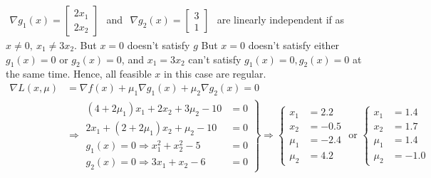 \documentclass[11pt,a4paper]{article}
\begin{document}
\begin{enumerate}[$\bullet$]
\begin{enumerate}[(1)]
        $\begin{aligned}
            \nabla g_1(x)=\begin{bmatrix}
                2x_1\\
                2x_2
            \end{bmatrix}
        \end{aligned}$ and $\begin{aligned}
            \nabla g_2(x)=\begin{bmatrix}
                3\\
                1
            \end{bmatrix}
        \end{aligned}$ are linearly independent if as $x\neq 0,\ x_1\neq 3x_2$. But $x=0$ doesn't satisfy $g$ But $x=0$ doesn't satisfy either $g_1(x)=0$ or $g_2(x)=0$, and $x_1=3x_2$ can't satisfy $g_1(x)=0,g_2(x)=0$ at the same time. Hence, all feasible $x$ in this case are regular.
        \begin{equation}
            \begin{aligned}
                \nabla L(x,\mu)&=\nabla f(x)+\mu_1 \nabla g_1(x)+\mu_2 \nabla g_2(x)=0\\
                &\Rightarrow \left.\begin{matrix}
                   (4+2\mu_1)x_1+2x_2+3\mu_2-10&=0\\
                   2x_1+(2+2\mu_1)x_2+\mu_2-10&=0\\
                   g_1(x)=0 \Rightarrow x_1^2+x_2^2-5&=0\\
                   g_2(x)=0 \Rightarrow 3x_1+x_2-6&=0
                \end{matrix}\right\}\Rightarrow	\left\{\begin{matrix}
                    x_1&=2.2\\
                    x_2&=-0.5\\
                  \mu_1&=-2.4\\
                  \mu_2&=4.2
                \end{matrix}\right.\text{ or }\left\{\begin{matrix}
                    x_1&=1.4\\
                    x_2&=1.7\\
                  \mu_1&=1.4\\
                  \mu_2&=-1.0
                \end{matrix}\right.
            \end{aligned}
            \nonumber

\end{equation}
\end{enumerate}
\end{enumerate}
\end{document}
